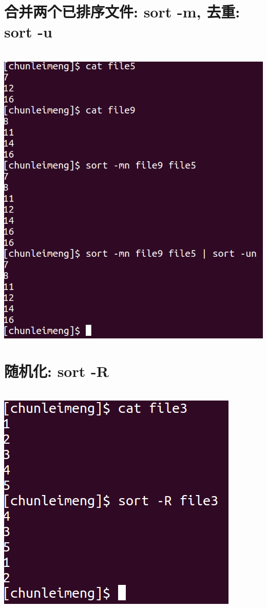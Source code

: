 \documentclass{article}
\begin{document}
\section{合并两个已排序文件: sort -m, 去重: sort -u}
~\\
\includegraphics[scale=0.45]{pic5.png} \par

\section{随机化: sort -R}
~\\
\includegraphics[scale=0.5]{pic6.png} \par
\end{document}

